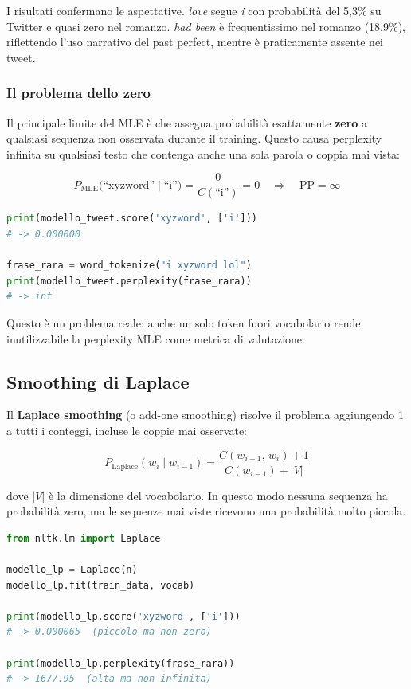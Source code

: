 \documentclass[12pt, a4paper]{article}
\begin{document}
I risultati confermano le aspettative. \textit{love} segue \textit{i}
con probabilità del 5,3\% su Twitter e quasi zero nel romanzo.
\textit{had been} è frequentissimo nel romanzo (18,9\%), riflettendo
l'uso narrativo del past perfect, mentre è praticamente assente nei tweet.

\subsubsection{Il problema dello zero}

Il principale limite del MLE è che assegna probabilità esattamente
\textbf{zero} a qualsiasi sequenza non osservata durante il training.
Questo causa perplexity infinita su qualsiasi testo che contenga
anche una sola parola o coppia mai vista:

\begin{equation}
P_{\text{MLE}}\bigl(\text{``xyzword''} \mid \text{``i''}\bigr)
= \frac{0}{C(\text{``i''})} = 0
\quad \Rightarrow \quad
\text{PP} = \infty
\end{equation}

\begin{lstlisting}[language=Python, caption=Dimostrazione del problema dello zero]
print(modello_tweet.score('xyzword', ['i']))
# -> 0.000000

frase_rara = word_tokenize("i xyzword lol")
print(modello_tweet.perplexity(frase_rara))
# -> inf
\end{lstlisting}

Questo è un problema reale: anche un solo token fuori vocabolario
rende inutilizzabile la perplexity MLE come metrica di valutazione.

\subsection{Smoothing di Laplace}

Il \textbf{Laplace smoothing} (o add-one smoothing) risolve il problema
aggiungendo 1 a tutti i conteggi, incluse le coppie mai osservate:

\begin{equation}
P_{\text{Laplace}}(w_i \mid w_{i-1}) =
\frac{C(w_{i-1},\, w_i) + 1}{C(w_{i-1}) + |V|}
\end{equation}

dove $|V|$ è la dimensione del vocabolario. In questo modo nessuna
sequenza ha probabilità zero, ma le sequenze mai viste ricevono
una probabilità molto piccola.

\begin{lstlisting}[language=Python, caption=Addestramento del modello Laplace]
from nltk.lm import Laplace

modello_lp = Laplace(n)
modello_lp.fit(train_data, vocab)

print(modello_lp.score('xyzword', ['i']))
# -> 0.000065  (piccolo ma non zero)

print(modello_lp.perplexity(frase_rara))
# -> 1677.95  (alta ma non infinita)
\end{lstlisting}
\end{document}

